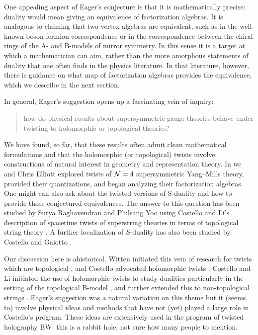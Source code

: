 \documentclass[11pt]{amsart}
\def\brian#1{{\textcolor{blue!65!red}{BW: {#1}}}}
\begin{document}
One appealing aspect of Eager's conjecture is that it is mathematically precise:
duality would mean giving an equivalence of factorization algebras.
It is analogous to claiming that two vertex algebras are equivalent,
such as in the well-known boson-fermion correspondence or in the correspondence between the chiral rings of the A- and B-models of mirror symmetry.
In this sense it is a target at which a mathematician can aim,
rather than the more amorphous statements of duality that one often finds in the physics literature.
In that literature, however, there is guidance on what map of factorization algebras provides the equivalence,
which we describe in the next section.

In general, Eager's suggestion opens up a fascinating vein of inquiry:
\begin{quote}
how do physical results about supersymmetric gauge theories behave under twisting to holomorphic or topological theories?
\end{quote}
We have found, so far, that these results often admit clean mathematical formulations and that the holomorphic (or topological) twists involve constructions of natural interest in geometry and representation theory.
In \cite{EGW} we and Chris Elliott explored twists of $\mathcal N=4$ supersymmetric Yang--Mills theory,
provided their quantizations, and began analyzing their factorization algebras.
One might can also ask about the twisted versions of S-duality and how to provide those conjectured equivalences.
The answer to this question has been studied by Surya Raghavendran and Philsang Yoo \cite{RYsduality} using Costello and Li's description of spacetime twists of superstring theories in terms of topological string theory \cite{CLsugra,CLtypeI}. 
A further localization of $S$-duality has also been studied by Costello and Gaiotto \cite{CGholography}.

\begin{rmk}
Our discussion here is ahistorical.
Witten initiated this vein of research for twists which are topological \cite{WittenTwist},
and Costello advocated holomorphic twists \cite{CostelloHol}.  
Costello and Li initiated the use of holomorphic twists to study dualities particularly in the setting of the topological B-model \cite{CLbcov1,CLbcov2,CLbcov3}, and further extended this to non-topological strings \cite{CLsugra}. 
Eager's suggestion was a natural variation on this theme but it (seems to) involve physical ideas and methods that have not (yet) played a large role in Costello's program.
These ideas are extensively used in the program of twisted holography \brian{this is a rabbit hole, not sure how many people to mention.}
\end{rmk}
\end{document}
